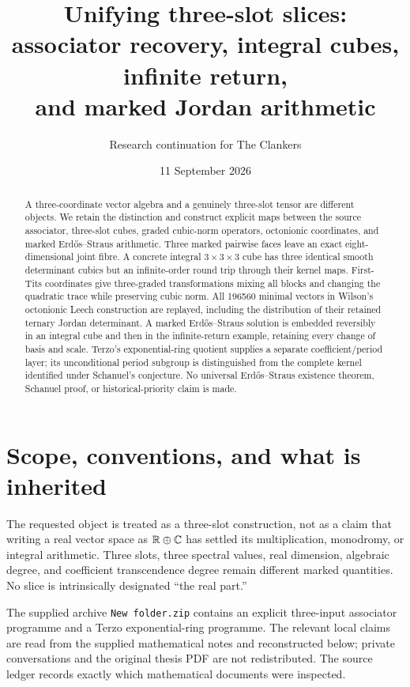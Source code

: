 \documentclass[11pt,reqno]{amsart}
\title[Three-slot cubes and marked Jordan arithmetic]{Unifying three-slot slices:\\ associator recovery, integral cubes, infinite return,\\ and marked Jordan arithmetic}
\author{Research continuation for The Clankers}
\date{11 September 2026}
\theoremstyle{definition}\newtheorem{definition}[theorem]{Definition}
\theoremstyle{remark}\newtheorem{remark}[theorem]{Remark}
\begin{document}
\begin{abstract}
A three-coordinate vector algebra and a genuinely three-slot tensor are different
objects. We retain the distinction and construct explicit maps between the source
associator, three-slot cubes, graded cubic-norm operators, octonionic coordinates,
and marked Erd\H{o}s--Straus arithmetic. Three marked pairwise faces leave an
exact eight-dimensional joint fibre. A concrete integral $3\times3\times3$ cube
has three identical smooth determinant cubics but an infinite-order round trip
through their kernel maps. First-Tits coordinates give three-graded transformations
mixing all blocks and changing the quadratic trace while preserving cubic norm.
All 196560 minimal vectors in Wilson's octonionic Leech construction are replayed,
including the distribution of their retained ternary Jordan determinant. A marked
Erd\H{o}s--Straus solution is embedded reversibly in an integral cube and then in
the infinite-return example, retaining every change of basis and scale. Terzo's
exponential-ring quotient supplies a separate coefficient/period layer; its
unconditional period subgroup is distinguished from the complete kernel identified
under Schanuel's conjecture. No universal Erd\H{o}s--Straus existence theorem,
Schanuel proof, or historical-priority claim is made.
\end{abstract}
\maketitle
\tableofcontents

\section{Scope, conventions, and what is inherited}

The requested object is treated as a three-slot construction, not as a claim that
writing a real vector space as $\mathbb R\oplus\mathbb C$ has settled its multiplication,
monodromy, or integral arithmetic. Three slots, three spectral values, real
dimension, algebraic degree, and coefficient transcendence degree remain different
marked quantities. No slice is intrinsically designated ``the real part.''

The supplied archive \texttt{New folder.zip} contains an explicit three-input
associator programme and a Terzo exponential-ring programme. The relevant local
claims are read from the supplied mathematical notes and reconstructed below;
private conversations and the original thesis PDF are not redistributed. The
source ledger records exactly which mathematical documents were inspected.
\end{document}
